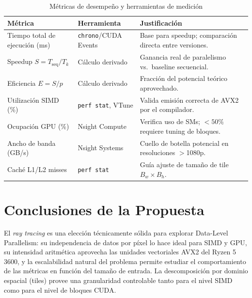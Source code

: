 \documentclass[conference]{IEEEtran}
\begin{document}
\begin{table}[H]
\centering
\caption{Métricas de desempeño y herramientas de medición}
\label{tab:metrics}
\small
\begin{tabular}{@{}p{2.2cm}p{2.6cm}p{2.8cm}@{}}
\toprule
\textbf{Métrica} & \textbf{Herramienta} & \textbf{Justificación} \\
\midrule
Tiempo total de ejecución (ms) &
  \texttt{chrono}/CUDA Events &
  Base para speedup; comparación directa entre versiones. \\[2pt]
Speedup $S{=}T_\text{seq}/T_k$ &
  Cálculo derivado &
  Ganancia real de paralelismo vs.\ baseline secuencial. \\[2pt]
Eficiencia $E{=}S/p$ &
  Cálculo derivado &
  Fracción del potencial teórico aprovechado. \\[2pt]
Utilización SIMD (\%) &
  \texttt{perf stat}, VTune &
  Valida emisión correcta de AVX2 por el compilador. \\[2pt]
Ocupación GPU (\%) &
  Nsight Compute &
  Verifica uso de SMs; $<50\%$ requiere tuning de bloques. \\[2pt]
Ancho de banda (GB/s) &
  Nsight Systems &
  Cuello de botella potencial en resoluciones $>$1080p. \\[2pt]
Caché L1/L2 misses &
  \texttt{perf stat} &
  Guía ajuste de tamaño de tile $B_w \times B_h$. \\[2pt]
\bottomrule
\end{tabular}
\end{table}

\section{Conclusiones de la Propuesta}

El \textit{ray tracing} es una elección técnicamente sólida para explorar
Data-Level Parallelism: su independencia de datos por píxel lo hace ideal para
SIMD y GPU, su intensidad aritmética aprovecha las unidades vectoriales AVX2 del
Ryzen 5 3600, y la escalabilidad natural del problema permite estudiar el comportamiento
de las métricas en función del tamaño de entrada. La descomposición por dominio espacial
(tiles) provee una granularidad controlable tanto para el nivel SIMD como para el
nivel de bloques CUDA.
\end{document}
